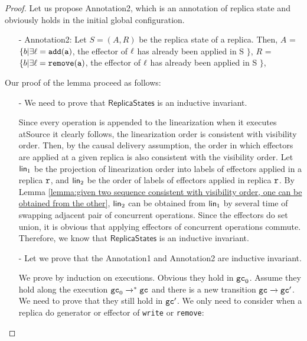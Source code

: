 \begin {proof}

Let us propose Annotation2, which is an annotation of replica state and obviously holds in the initial global configuration.

\begin{itemize}
\setlength{\itemsep}{0.5pt}
\item[-] Annotation2: Let $S = (A,R)$ be the replica state of a replica. Then, $A$ =  $\{ b \vert \exists \alabel = \alabelshort[{\tt add}]{a}$, the effector of $\ell$ has already been applied in S $\}$,
    $R$ =  $\{ b \vert \exists \alabel = \alabelshort[{\tt remove}]{a}$, the effector of $\ell$ has already been applied in S $\}$,
\end{itemize}

Our proof of the lemma proceed as follows:

\begin{itemize}
\setlength{\itemsep}{0.5pt}
\item[-] We need to prove that $\mathsf{ReplicaStates}$ is an inductive invariant.

Since every operation is appended to the linearization when it executes atSource it clearly follows, the linearization order is consistent with visibility order. Then, by the causal delivery assumption, the order in which effectors are applied at a given replica is also consistent with the visibility order. Let $\mathsf{lin}_1$ be the projection of linearization order into labels of effectors applied in a replica $\mathtt{r}$, and $\mathsf{lin}_2$ be the order of labels of effectors applied in replica $\mathtt{r}$. By Lemma \ref{lemma:given two sequence consistent with visibility order, one can be obtained from the other}, $\mathsf{lin}_2$ can be obtained from $\mathsf{lin}_1$ by several time of swapping adjacent pair of concurrent operations. Since the effectors do set union, it is obvious that applying effectors of concurrent operations commute. Therefore, we know that $\mathsf{ReplicaStates}$ is an inductive invariant.

\item[-] Let we prove that the Annotation1 and Annotation2 are inductive invariant.

We prove by induction on executions. Obvious they hold in $\mathtt{gc}_0$. Assume they hold along the execution $\mathtt{gc}_0 \xrightarrow{}^* \mathtt{gc}$ and there is a new transition $\mathtt{gc} \xrightarrow{} \mathtt{gc}'$. We need to prove that they still hold in $\mathtt{gc}'$. We only need to consider when a replica do generator or effector of {\tt write} or {\tt remove}:


\end{itemize}
\end{proof}
